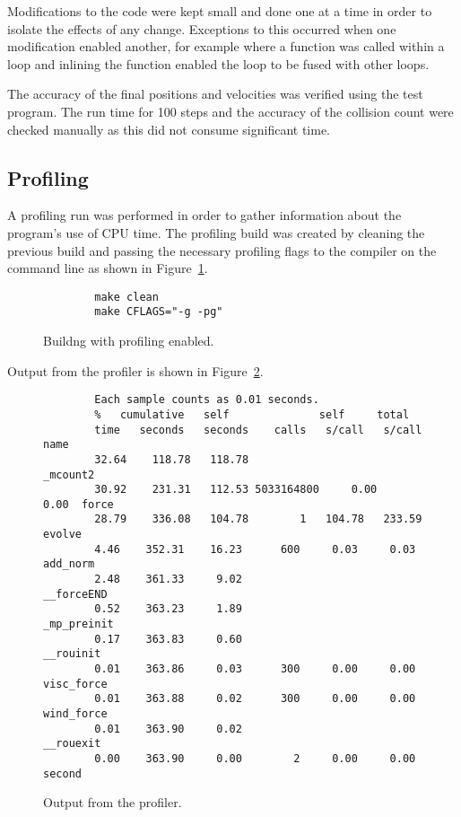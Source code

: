 \documentclass[11pt, oneside]{article}   %
\begin{document}
Modifications to the code were kept small and done one at a time in order to isolate the effects of any change.
Exceptions to this occurred when one modification enabled another,  for example where a function was called within a loop and inlining the function enabled the loop to be fused with other loops.

The accuracy of the final positions and velocities was verified using the test program.
The run time for 100 steps and the accuracy of the collision count were checked manually as this did not consume significant time.

\subsection{Profiling}

A profiling run was performed in order to gather information about the program's use of CPU time.
The profiling build was created by cleaning the previous build and passing the necessary profiling flags to the compiler on the command line as shown in Figure~\ref{figure:ProfMake}.

\begin{figure}
	\begin{lstlisting}
		make clean
		make CFLAGS="-g -pg"
	\end{lstlisting}
	\caption{Buildng with profiling enabled.}
	\label{figure:ProfMake}
\end{figure}

Output from the profiler is shown in Figure~\ref{figure:ProfOutput}.
\begin{figure}
	\begin{lstlisting}
		Each sample counts as 0.01 seconds.
		%   cumulative   self              self     total           
		time   seconds   seconds    calls   s/call   s/call  name    
		32.64    118.78   118.78                             _mcount2
		30.92    231.31   112.53 5033164800     0.00     0.00  force
		28.79    336.08   104.78        1   104.78   233.59  evolve
		4.46    352.31    16.23      600     0.03     0.03  add_norm
		2.48    361.33     9.02                             __forceEND
		0.52    363.23     1.89                             _mp_preinit
		0.17    363.83     0.60                             __rouinit
		0.01    363.86     0.03      300     0.00     0.00  visc_force
		0.01    363.88     0.02      300     0.00     0.00  wind_force
		0.01    363.90     0.02                             __rouexit
		0.00    363.90     0.00        2     0.00     0.00  second
	\end{lstlisting}
	\caption{Output from the profiler.}
	\label{figure:ProfOutput}
\end{figure}
\end{document}
